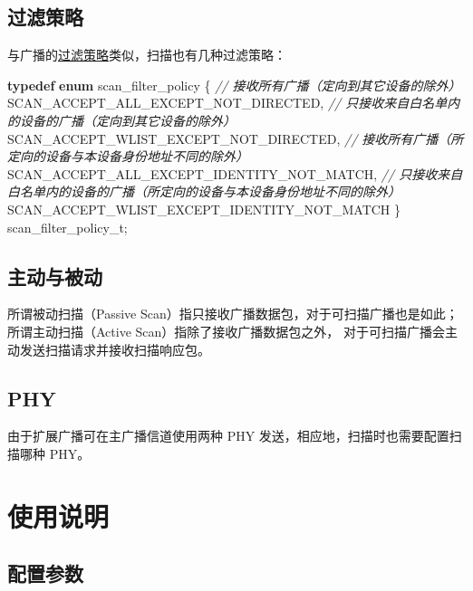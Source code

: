 \documentclass[
  12pt,
]{book}
\newenvironment{Shaded}{\begin{snugshade}}{\end{snugshade}}
\newcommand{\CommentTok}[1]{\textcolor[rgb]{0.56,0.35,0.01}{\textit{#1}}}
\newcommand{\KeywordTok}[1]{\textcolor[rgb]{0.13,0.29,0.53}{\textbf{#1}}}
\newcommand{\NormalTok}[1]{#1}
\begin{document}
\hypertarget{ux8fc7ux6ee4ux7b56ux7565}{%
\subsection{过滤策略}\label{ux8fc7ux6ee4ux7b56ux7565}}

与广播的\protect\hyperlink{ch1-adv-filter}{过滤策略}类似，扫描也有几种过滤策略：

\begin{Shaded}
\begin{Highlighting}[]
\KeywordTok{typedef} \KeywordTok{enum}\NormalTok{ scan_filter_policy}
\NormalTok{\{}
    \CommentTok{// 接收所有广播（定向到其它设备的除外）}
\NormalTok{    SCAN_ACCEPT_ALL_EXCEPT_NOT_DIRECTED,}
    \CommentTok{// 只接收来自白名单内的设备的广播（定向到其它设备的除外）}
\NormalTok{    SCAN_ACCEPT_WLIST_EXCEPT_NOT_DIRECTED,}
    \CommentTok{// 接收所有广播（所定向的设备与本设备身份地址不同的除外）}
\NormalTok{    SCAN_ACCEPT_ALL_EXCEPT_IDENTITY_NOT_MATCH,}
    \CommentTok{// 只接收来自白名单内的设备的广播（所定向的设备与本设备身份地址不同的除外）}
\NormalTok{    SCAN_ACCEPT_WLIST_EXCEPT_IDENTITY_NOT_MATCH}
\NormalTok{\} scan_filter_policy_t;}
\end{Highlighting}
\end{Shaded}

\hypertarget{ux4e3bux52a8ux4e0eux88abux52a8}{%
\subsection{主动与被动}\label{ux4e3bux52a8ux4e0eux88abux52a8}}

所谓被动扫描（Passive Scan）指只接收广播数据包，对于可扫描广播也是如此；所谓主动扫描（Active Scan）指除了接收广播数据包之外，
对于可扫描广播会主动发送扫描请求并接收扫描响应包。

\hypertarget{phy-1}{%
\subsection{PHY}\label{phy-1}}

由于扩展广播可在主广播信道使用两种 PHY 发送，相应地，扫描时也需要配置扫描哪种 PHY。

\hypertarget{ux4f7fux7528ux8bf4ux660e-1}{%
\section{使用说明}\label{ux4f7fux7528ux8bf4ux660e-1}}

\hypertarget{ux914dux7f6eux53c2ux6570}{%
\subsection{配置参数}\label{ux914dux7f6eux53c2ux6570}}
\end{document}
